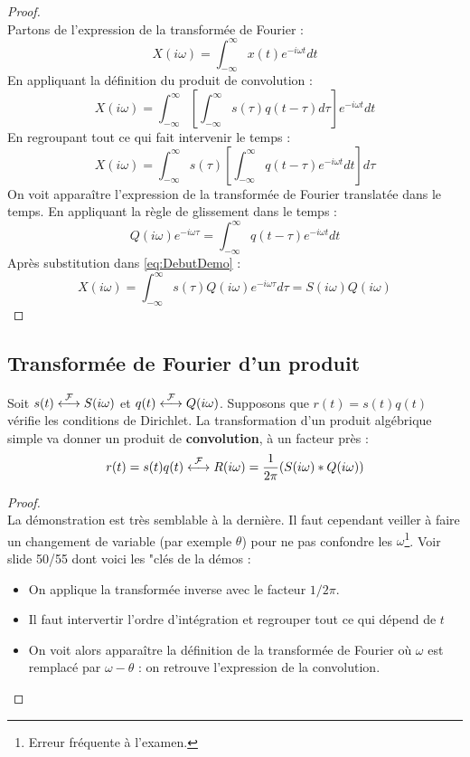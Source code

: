 	\begin{proof}\ \\
	Partons de l'expression de la transformée de Fourier :
	\begin{equation}
	X(i\omega) = \int_{-\infty}^\infty x(t)e^{-i\omega t}dt
	\label{eq:DebutDemo}
	\end{equation}
	En appliquant la définition du produit de convolution :
	\begin{equation}
	X(i\omega) = \int_{-\infty}^\infty \left[\int_{-\infty}^\infty s(\tau)q(t-\tau)d\tau
	\right]e^{-i\omega t}dt
	\end{equation}
	En regroupant tout ce qui fait intervenir le temps :
	\begin{equation}
	X(i\omega) = \int_{-\infty}^\infty s(\tau)\left[\int_{-\infty}^\infty q(t-\tau)e^{-i
	\omega t}dt\right]d\tau
	\end{equation}
	On voit apparaître l'expression de la transformée de Fourier translatée dans le temps. En
	appliquant la règle de glissement dans le temps : 
	\begin{equation}
	Q(i\omega)e^{-i\omega \tau} = \int_{-\infty}^\infty q(t-\tau)e^{-i\omega t}dt
	\end{equation}
	Après substitution dans \autoref{eq:DebutDemo} :
	\begin{equation}
	X(i\omega) = \int_{-\infty}^\infty s(\tau)Q(i\omega)e^{-i\omega\tau}d\tau = S(i\omega)Q(i
	\omega)
	\end{equation}
	\end{proof}
	
	\subsection{Transformée de Fourier d'un produit}
	Soit $s(t) \ft S(i\omega)$ et $q(t) \ft Q(i\omega)$. Supposons que $r(t) = s(t)q(t)$ 
	vérifie les conditions de Dirichlet. La transformation d'un produit algébrique simple 
	va donner un produit de \textbf{convolution}, à un facteur près :
	\begin{equation}
	r(t) = s(t)q(t) \ft R(i\omega) = \frac{1}{2\pi}(S(i\omega)*Q(i\omega))
	\end{equation}
	
	\begin{proof}\ \\
	La démonstration est très semblable à la dernière. Il faut cependant veiller à faire un 
	changement de variable (par exemple $\theta$) pour ne pas confondre les $\omega$\footnote{
	Erreur fréquente à l'examen.}. Voir slide 50/55 dont voici les "clés de la démos :
	\begin{itemize}
	\item On applique la transformée inverse avec le facteur $1/2\pi$.
	\item Il faut intervertir l'ordre d'intégration et regrouper tout ce qui dépend de $t$
	\item On voit alors apparaître la définition de la transformée de Fourier où  $\omega$
	est remplacé par $\omega-\theta$ : on retrouve l'expression de la convolution.
	\end{itemize}
	\end{proof}
	
